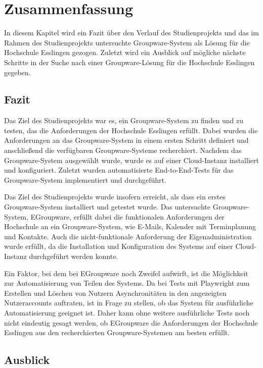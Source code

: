 \chapter{Zusammenfassung}

In diesem Kapitel wird ein Fazit über den Verlauf des Studienprojekts und das im Rahmen des Studienprojekts untersuchte Groupware-System als Lösung für die Hochschule Esslingen gezogen.
Zuletzt wird ein Ausblick auf mögliche nächste Schritte in der Suche nach einer Groupware-Lösung für die Hochschule Esslingen gegeben.

\section{Fazit}

Das Ziel des Studienprojekts war es, ein Groupware-System zu finden und zu testen, das die Anforderungen der Hochschule Esslingen erfüllt.
Dabei wurden die Anforderungen an das Groupware-System in einem ersten Schritt definiert und anschließend die verfügbaren Groupware-Systeme recherchiert.
Nachdem das Groupware-System ausgewählt wurde, wurde es auf einer Cloud-Instanz installiert und konfiguriert.
Zuletzt wurden automatisierte End-to-End-Tests für das Groupware-System implementiert und durchgeführt.

Das Ziel des Studienprojekts wurde insofern erreicht, als dass ein erstes Groupware-System installiert und getestet wurde.
Das untersuchte Groupware-System, EGroupware, erfüllt dabei die funktionalen Anforderungen der Hochschule an ein Groupware-System, wie E-Mails, Kalender mit Terminplanung und Kontakte.
Auch die nicht-funktionale Anforderung der Eigenadministration wurde erfüllt, da die Installation und Konfiguration des Systems auf einer Cloud-Instanz durchgeführt werden konnte.

Ein Faktor, bei dem bei EGroupware noch Zweifel aufwirft, ist die Möglichkeit zur Automatisierung von Teilen des Systems.
Da bei Tests mit Playwright zum Erstellen und Löschen von Nutzern Asynchronitäten in den angezeigten Nutzeraccounts auftraten, ist in Frage zu stellen, ob das System für ausführliche Automatisierung geeignet ist.
Daher kann ohne weitere ausführliche Tests noch nicht eindeutig gesagt werden, ob EGroupware die Anforderungen der Hochschule Esslingen aus den recherchierten Groupware-Systemen am besten erfüllt.


\section{Ausblick}

